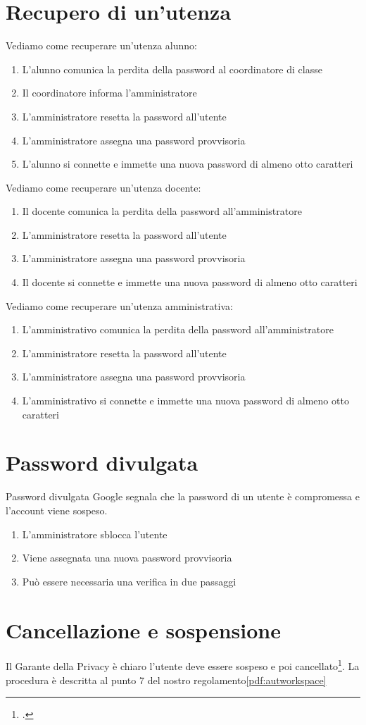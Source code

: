 \section{Recupero di un'utenza}
Vediamo come recuperare un'utenza alunno:
\begin{enumerate}
	\item L'alunno comunica la perdita della password al coordinatore di classe
	\item Il coordinatore informa l'amministratore
	\item L'amministratore resetta la password all'utente
	\item L'amministratore assegna una password provvisoria 
	\item L'alunno si connette e immette una nuova password di almeno otto 
	caratteri 
\end{enumerate}
Vediamo come recuperare un'utenza docente:
\begin{enumerate}
	\item Il docente comunica la perdita della password all'amministratore
	\item L'amministratore resetta la password all'utente
	\item L'amministratore assegna una password provvisoria 
	\item Il docente si connette e immette una nuova password di almeno otto 
	caratteri 
\end{enumerate}
Vediamo come recuperare un'utenza amministrativa:
\begin{enumerate}
	\item L'amministrativo comunica la perdita della password all'amministratore
	\item L'amministratore resetta la password all'utente
	\item L'amministratore assegna una password provvisoria 
	\item L'amministrativo si connette e immette una nuova password di almeno 
	otto caratteri 
\end{enumerate}
\section{Password divulgata}
Password divulgata Google segnala che la password di un utente è compromessa e 
l'account viene sospeso.
\begin{enumerate}
	\item L'amministratore sblocca l'utente
	\item Viene assegnata una nuova password provvisoria 
	\item Può essere necessaria una verifica in due passaggi
\end{enumerate}
\section{Cancellazione e sospensione}
Il Garante della Privacy è chiaro l'utente deve essere sospeso e 
poi cancellato\footcite{Garante2019}. La procedura è descritta al punto 7 del nostro regolamento\ref{pdf:autworkspace}
